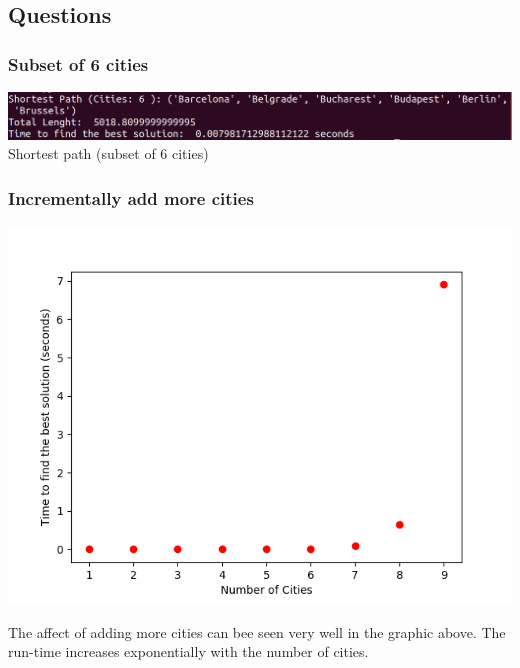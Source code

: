 \documentclass[10pt,a4paper]{article}
\begin{document}
	\subsection{Questions}
	\subsubsection{Subset of 6 cities}
	\begin{center}
		\includegraphics[width=1.0\linewidth]{pictures/exhaustiveSearch/cities6}
		Shortest path (subset of 6 cities)
	\end{center}
	
	\subsubsection{Incrementally add more cities}
	\begin{center}
		\includegraphics[width=0.8\linewidth]{pictures/exhaustiveSearch/exhaustive_search6}
	\end{center}
	The affect of adding more cities can bee seen very well in the graphic above. The run-time increases exponentially with the number of cities.
	
\end{document}
